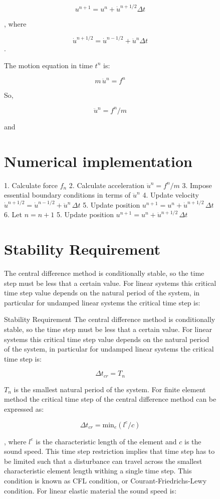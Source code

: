 \documentclass[11pt,a4paper]{article}
\begin{document}
\begin{figure}[h]
$$ u^{n+1} = u^{n} + \dot u ^ {n+1/2} \Delta t $$

, where

$$ \dot u^{n+1/2} = \dot{ u } ^ {n-1/2} + \ddot u ^ {n}  \Delta t $$.

The motion equation in time $ t^{n} $ is:

$$ m \, \ddot u ^{n} = f ^{n} $$

So,

$$ \ddot u ^{n} = f ^{n} / m $$

and
\section{Numerical implementation}

1. Calculate force  $ f_n  $
2. Calculate acceleration  $ \ddot u ^{n} = f ^{n} / m  $
3. Impose essential boundary conditions in terms of  $ \ddot u ^{n}  $
4. Update velocity  $ \dot u ^ {n+1/2} = \dot u ^ {n-1/2} + \ddot u ^{n} \, \Delta t  $
5. Update position  $ u^{n+1} = u^{n} + \dot u ^ {n+1/2} \, \Delta t  $
6. Let  $ n = n + 1  $
5. Update position  $ u^{n+1} = u^{n} + \dot u ^ {n+1/2} \, \Delta t  $

\section{Stability Requirement}
The central difference method is conditionally stable, so the time step must be less that a certain value. For linear systems this critical time step value depends on the natural period of the system, in particular for undamped linear systems the critical time step is:

Stability Requirement
The central difference method is conditionally stable, so the time step must be less that a certain value. For linear systems this critical time step value depends on the natural period of the system, in particular for undamped linear systems the critical time step is:

$$ \Delta t_{cr} = T_n $$

 $ T_n  $ is the smallest natural period of the system. For finite element method the critical time step of the central difference method can be expressed as:

$$ \Delta t_{cr} = \text{min}_e (l^e / c )  $$

, where  $ l^e  $ is the characteristic length of the element and  $ c  $ is the sound speed. This time step restriction implies that time step has to be limited such that a disturbance can travel across the smallest characteristic element length withing a single time step. This condition is known as CFL condition, or Courant-Friedrichs-Lewy condition. For linear elastic material the sound speed is:


\end{figure}
\end{document}
